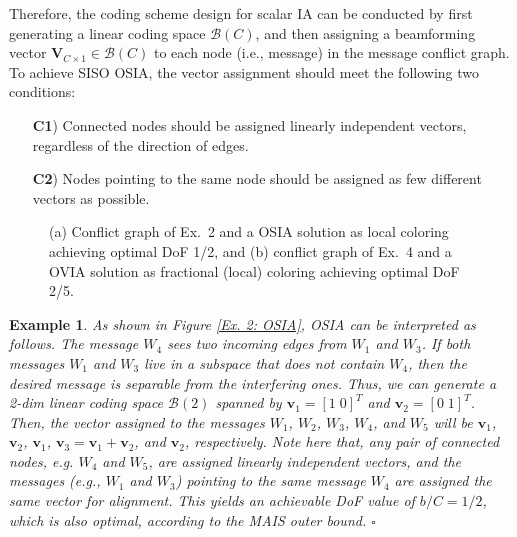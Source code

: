 \documentclass[a4paper,journal]{IEEEtran}
\def\v {\mathbf{v}}
\newtheorem{exe}{Example}
\begin{document}
Therefore, the coding scheme design for scalar IA can be conducted by first generating a linear coding space $\mathcal{B}(C)$, and then assigning a beamforming vector $\mathbf{V}_{C\times 1} \in \mathcal{B}(C)$ to each node (i.e., message) in the message conflict graph.
To achieve SISO OSIA, the vector assignment should meet the following two conditions:
\begin{itemize}
  \item [\textbf{C1})] Connected nodes should be assigned linearly independent vectors, regardless of the direction of edges.
  \item [\textbf{C2})] Nodes pointing to the same node should be assigned as few different vectors as possible.
\end{itemize}


\begin{figure}
   \centering
   \hfil
   \caption{(a) Conflict graph of Ex.~2 and a OSIA solution as local coloring achieving optimal DoF 1/2, and (b) conflict graph of Ex.~4 and a OVIA solution as fractional (local) coloring achieving optimal DoF 2/5.}
   \label{5_nodes_sample_vectorIA}
\end{figure}

\begin{exe}
As shown in Figure \ref{Ex. 2: OSIA}, OSIA can be interpreted as follows. The message $W_{4}$ sees two incoming edges from $W_{1}$ and $W_{3}$. If both messages $W_{1}$ and $W_{3}$ live in a subspace that does not contain $W_{4}$, then the desired message is separable from the interfering ones. Thus, we can generate a 2-dim linear coding space $\mathcal{B}(2)$ spanned by $\v_1=[1 \; 0]^T$ and $\v_2=[0 \; 1]^T$. Then, the vector assigned to the messages $W_{1}$, $W_{2}$, $W_{3}$, $W_{4}$, and $W_{5}$ will be $\v_1$, $\v_2$, $\v_1$, $\v_3=\v_1+\v_2$, and $\v_2$, respectively. Note here that, any pair of connected nodes, e.g. $W_{4}$ and $W_{5}$, are assigned linearly independent vectors, and the messages (e.g., $W_{1}$ and $W_{3}$) pointing to the same message $W_{4}$ are assigned the same vector for alignment. This yields an achievable DoF value of $b/C=1/2$, which is also optimal, according to the MAIS outer bound. \hfill $\square$
\end{exe}
\end{document}
